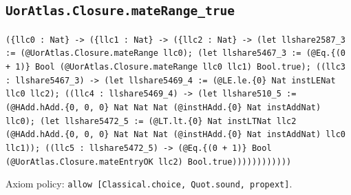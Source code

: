 \documentclass[11pt]{article}
\begin{document}
\subsection*{\texttt{UorAtlas.Closure.mateRange\_true}}
\noindent\texttt{(\{llc0 : Nat\} -> (\{llc1 : Nat\} -> (\{llc2 : Nat\} -> (let llshare2587\_3 := (@UorAtlas.Closure.mateRange llc0); (let llshare5467\_3 := (@Eq.\{(0 + 1)\} Bool (@UorAtlas.Closure.mateRange llc0 llc1) Bool.true); ((llc3 : llshare5467\_3) -> (let llshare5469\_4 := (@LE.le.\{0\} Nat instLENat llc0 llc2); ((llc4 : llshare5469\_4) -> (let llshare510\_5 := (@HAdd.hAdd.\{0, 0, 0\} Nat Nat Nat (@instHAdd.\{0\} Nat instAddNat) llc0); (let llshare5472\_5 := (@LT.lt.\{0\} Nat instLTNat llc2 (@HAdd.hAdd.\{0, 0, 0\} Nat Nat Nat (@instHAdd.\{0\} Nat instAddNat) llc0 llc1)); ((llc5 : llshare5472\_5) -> (@Eq.\{(0 + 1)\} Bool (@UorAtlas.Closure.mateEntryOK llc2) Bool.true))))))))))))}\par
\noindent Axiom policy: \texttt{allow [Classical.choice, Quot.sound, propext]}.\par
\end{document}
